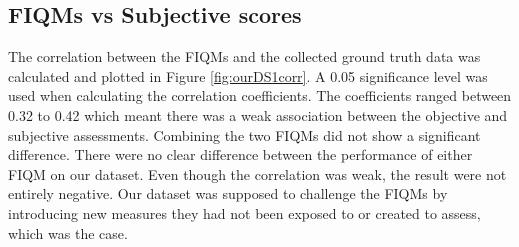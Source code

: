 \subsection{FIQMs vs Subjective scores}
The correlation between the FIQMs and the collected ground truth data was calculated and plotted in Figure \ref{fig:ourDS1corr}. A 0.05 significance level was used when calculating the correlation coefficients. The coefficients ranged between 0.32 to 0.42 which meant there was a weak association between the objective and subjective assessments. Combining the two FIQMs did not show a significant difference. There were no clear difference between the performance of either FIQM on our dataset. Even though the correlation was weak, the result were not entirely negative. Our dataset was supposed to challenge the FIQMs by introducing new measures they had not been exposed to or created to assess, which was the case. 

